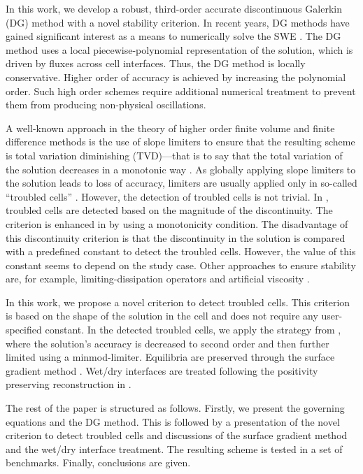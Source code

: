 In this work, we develop a robust, third-order accurate discontinuous
Galerkin (DG) method with a novel stability criterion. In recent
years, DG methods have gained significant interest as a means to
numerically solve the SWE \cite{CaviedesVoullieme2015, kesserwani2015,
  Vater20151, Marras:2016, Kesserwani2019, Vater2019,
  CaviedesVoullieme2020, NavasMontilla2020}.  The DG method uses a
local piecewise-polynomial representation of the solution, which is
driven by fluxes across cell interfaces.  Thus, the DG method is
locally conservative.  Higher order of accuracy is achieved by
increasing the polynomial order.  Such high order schemes require
additional numerical treatment to prevent them from producing
non-physical oscillations.

A well-known approach in the theory of higher order finite volume and
finite difference methods is the use of slope limiters to ensure that
the resulting scheme is total variation diminishing (TVD)---that is to
say that the total variation of the solution decreases in a monotonic
way \cite{leveque2}.  As globally applying slope limiters to the
solution leads to loss of accuracy, limiters are usually applied only
in so-called ``troubled cells'' \cite{krivodonova2004, shu2005}.
However, the detection of troubled cells is not trivial.  In
\cite{Ambati2007452, krivodonova2004}, troubled cells are detected
based on the magnitude of the discontinuity. The criterion is enhanced
in \cite{kesserwani2015} by using a monotonicity condition.  The
disadvantage of this discontinuity criterion is that the discontinuity
in the solution is compared with a predefined constant to detect the
troubled cells. However, the value of this constant seems to depend on
the study case.  Other approaches to ensure stability are, for
example, limiting-dissipation operators \cite{JAFFRE1995,
  Ambati2007452} and artificial viscosity \cite{cesenek2013,
  bublik2011, Bublik2015329}.

In this work, we propose a novel criterion to detect troubled cells.
This criterion is based on the shape of the solution in the cell and
does not require any user-specified constant.  In the detected
troubled cells, we apply the strategy from \cite{Cockburn1989b}, where
the solution's accuracy is decreased to second order and then further
limited using a minmod-limiter.  Equilibria are preserved through the
surface gradient method \cite{zhou}.  Wet/dry interfaces are treated
following the positivity preserving reconstruction in \cite{kurg2}.

The rest of the paper is structured as follows.  Firstly, we present
the governing equations and the DG method.  This is followed by a
presentation of the novel criterion to detect troubled cells and
discussions of the surface gradient method and the wet/dry interface
treatment.  The resulting scheme is tested in a set of benchmarks.
Finally, conclusions are given.

